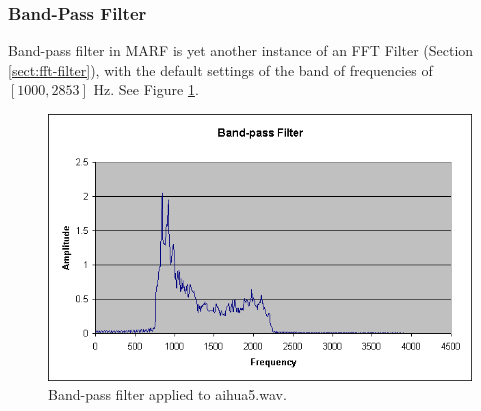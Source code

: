 \subsubsection{Band-Pass Filter}

Band-pass filter in MARF is yet another instance of an FFT Filter (Section \ref{sect:fft-filter}),
with the default settings of the band of frequencies of $[1000, 2853]$ Hz. See Figure \ref{fig:band-pass}.

\begin{figure}
	\centering
	\includegraphics[width=400pt]{../graphics/graphs/band-pass-filter.png}
	\caption{Band-pass filter applied to aihua5.wav.}
	\label{fig:band-pass}
\end{figure}
